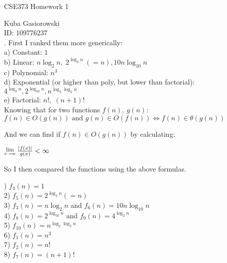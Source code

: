 \documentclass[12pt]{report}
\newcommand{\Lim}[1]{\raisebox{0.5ex}{\scalebox{0.8}{$\displaystyle \lim_{#1}\;$}}}
\newcommand{\no}{\noindent}
\begin{document}
	
	\Large
	\centering
	CSE373 Homework 1
	
	\justify
	\normalsize
	
	Kuba Gasiorowski\\
	ID: 109776237\\
	
	\no 1. First I ranked them more generically:\\
	
	\no a) Constant: $1$\\
	b) Linear: $n\log_2 n, \; 2^{\log_2n}\:(= n), 10n\log_{10}n$\\
	c) Polynomial: $n^3$ \\
	d) Exponential (or higher than poly, but lower than factorial): $4^{\log_2n}, 2^{\log_{50}n}, n^{\log_2\log_2n}$ \\
	e) Factorial: $n!, \; (n+1)!$\\
	
	\no Knowing that for two functions $f(n),\:g(n): $\\
	
	\centering 
	$f(n) \in O(g(n)) \text{ and } g(n) \in O(f(n)) \iff  f(n) \in \theta{}(g(n))$\\
	
	\justify
	
	And we can find if $ f(n) \in O(g(n))$ by calculating: \\ 
	
	\centering
	
	$\Lim{x\rightarrow\infty} \frac{|f(x)|}{g(x)} < \infty$
	
	\justify
	
	So I then compared the functions using the above formulas.
	
	\no 1) $f_4(n) = 1$ \\
	2) $f_5(	n) = 2^{\log_2n} (= n)$ \\
	3) $f_3(n) = n\log_2n$ and $f_6(n) = 10n\log_{10}n$\\
	4) $f_8(n) = 2^{\log_{50}n} \text{ and } f_9(n) = 4^{\log_2n}$ \\
	5) $f_{10}(n) = n^{\log_2\log_2n}$\\
	6) $f_1(n) = n^3$ \\
	7) $f_2(n) = n!$ \\
	8) $f_7(n) = (n+1)!$\\
	
\end{document}
